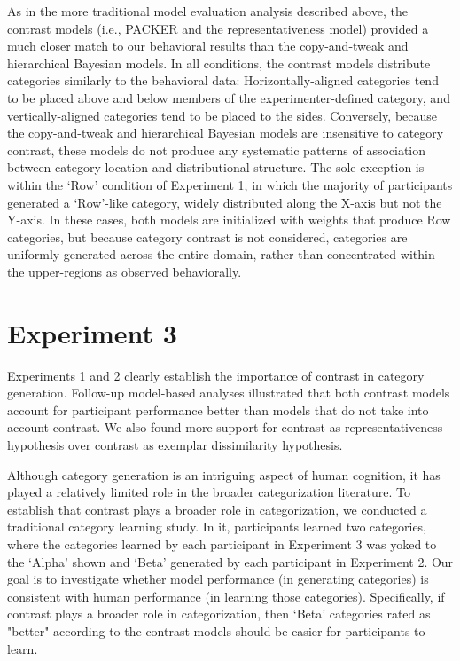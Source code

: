 \documentclass[12pt]{article}
\begin{document}
\begin{flushleft}
As in the more traditional model evaluation analysis described above, the
contrast models (i.e., PACKER and the representativeness model) provided a much
closer match to our behavioral results than the copy-and-tweak and hierarchical
Bayesian models. In all conditions, the contrast models distribute categories
similarly to the behavioral data: Horizontally-aligned categories tend to be
placed above and below members of the experimenter-defined category, and
vertically-aligned categories tend to be placed to the sides. Conversely,
because the copy-and-tweak and hierarchical Bayesian models are insensitive to
category contrast, these models do not produce any systematic patterns of
association between category location and distributional structure. The sole
exception is within the `Row' condition of Experiment 1, in which the majority
of participants generated a `Row'-like category, widely distributed along the
X-axis but not the Y-axis. In these cases, both models are initialized with
weights that produce Row categories, but because category contrast is not
considered, categories are uniformly generated across the entire domain, rather
than concentrated within the upper-regions as observed behaviorally.

\section{Experiment 3}

Experiments 1 and 2 clearly establish the importance of contrast in category
generation. Follow-up model-based analyses illustrated that both contrast models
account for participant performance better than models that do not take into
account contrast. We also found more support for contrast as representativeness
hypothesis over contrast as exemplar dissimilarity hypothesis.

Although category generation is an intriguing aspect of human cognition, it has
played a relatively limited role in the broader categorization literature. To
establish that contrast plays a broader role in categorization, we conducted a
traditional category learning study. In it, participants learned two categories,
where the categories learned by each participant in Experiment 3 was yoked to
the `Alpha' shown and `Beta' generated by each participant in Experiment 2. Our goal
is to investigate whether model performance (in generating categories) is
consistent with human performance (in learning those categories). Specifically, if contrast plays a broader role in categorization, then `Beta' categories rated as "better" according
to the contrast models should be easier for participants to learn.

\end{flushleft}
\end{document}
